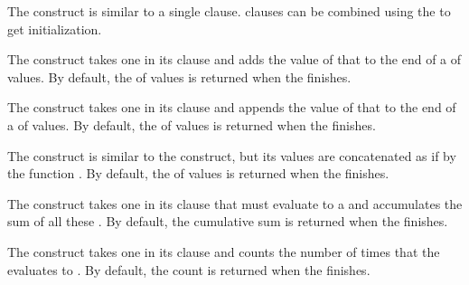 
\itemitem{--}  
  The  construct is similar to a single  clause.
   clauses can be combined using the  
  to get  initialization.

 
\endlist 

\endsubsubsubsection%

 
\beginlist

\itemitem{--}
  The  construct takes one  in its clause
  and adds the value of that  to the end of a  
  of values.  By default, the  of values is returned 
  when the  finishes.
 
\itemitem{--} 
  The  construct takes one  in its clause
  and appends the value of that  to the end of a 
  of values.  By default, the  of values is returned when the 
   finishes.
 
\itemitem{--}
  The  construct is similar to the  construct,  
  but its  values are concatenated as if by the function
  .  By default, the  of values is returned when 
  the  finishes.
 
\itemitem{--}
  The  construct takes one  in its clause that
  must evaluate to a  and accumulates the sum of all these
  .  By default, the cumulative sum is returned when the
   finishes.
 
\itemitem{--}  
  The  construct takes one  in its clause 
  and counts the number of times that the  evaluates to .
  By default, the count is returned when the  finishes.
 

